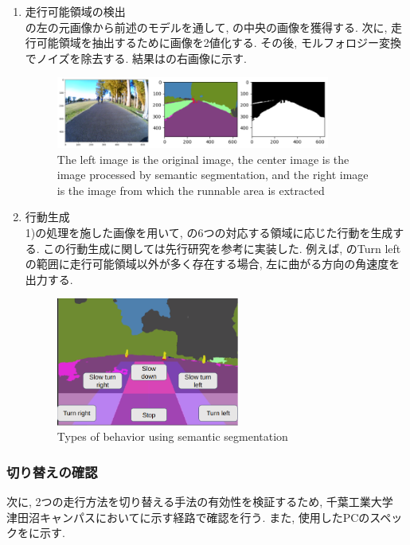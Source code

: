 \documentclass[uplatex, twocolumn, 9pt]{jsproceedings}
\begin{document}
  \newpage
  \begin{enumerate}
    \item 走行可能領域の検出\\
  の左の元画像から前述のモデルを通して, の中央の画像を獲得する. 次に, 走行可能領域を抽出するために画像を2値化する. その後, モルフォロジー変換\cite{morphological}でノイズを除去する. 結果はの右画像に示す.
  \begin{figure}[h]
    \centering
    \includegraphics[width=90mm]{fig/tsukuba-seg.pdf}
    \caption{The left image is the original image, the center image is the image processed by semantic segmentation, and the right image is the image from which the runnable area is extracted}
    \label{fig:seg_runarea}%
  \end{figure}
  \item 行動生成\\
  1)の処理を施した画像を用いて, の6つの対応する領域に応じた行動を生成する. この行動生成に関しては先行研究\cite{meiji-thesis}を参考に実装した. 例えば, のTurn leftの範囲に走行可能領域以外が多く存在する場合, 左に曲がる方向の角速度を出力する. 
  \begin{figure}[h]
    \centering
    \includegraphics[width=60mm]{fig/seg.pdf}
    \caption{Types of behavior using semantic segmentation}
    \label{fig:seg}%
  \end{figure}
\end{enumerate}

\subsubsection{切り替えの確認}
次に, 2つの走行方法を切り替える手法の有効性を検証するため, 千葉工業大学 津田沼キャンパスにおいてに示す経路で確認を行う. また, 使用したPCのスペックをに示す. 
\end{document}
